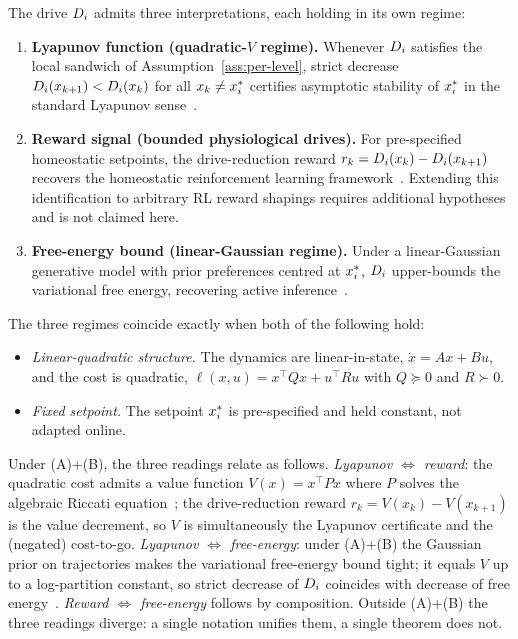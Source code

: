 \documentclass[11pt,a4paper]{article}
\begin{document}
\begin{proposition}
\label{prop:triple}
The drive $D_{i}$ admits three interpretations, each holding in its
own regime:
\begin{enumerate}
  \item \textbf{Lyapunov function (quadratic-$V$ regime).}  Whenever
        $D_{i}$ satisfies the local sandwich of
        Assumption~\ref{ass:per-level}, strict decrease
        $D_{i}(x_{k+1}) < D_{i}(x_k)$ for all $x_k \neq
        x^*_{i}$ certifies asymptotic stability of $x^*_{i}$
        in the standard Lyapunov
        sense~\cite{khalil2002nonlinear}.
  \item \textbf{Reward signal (bounded physiological drives).}  For
        pre-specified homeostatic setpoints, the drive-reduction reward
        $r_k = D_{i}(x_k) - D_{i}(x_{k+1})$ recovers the
        homeostatic reinforcement learning
        framework~\cite{keramati2014homeostatic}.  Extending this
        identification to arbitrary RL reward shapings requires
        additional hypotheses and is not claimed here.
  \item \textbf{Free-energy bound (linear-Gaussian regime).}  Under a
        linear-Gaussian generative model with prior preferences centred
        at $x^*_{i}$, $D_{i}$ upper-bounds the variational
        free energy, recovering active
        inference~\cite{friston2009reinforcement,baltieri2019pid}.
\end{enumerate}
The three regimes coincide exactly when both of the following hold:
\begin{itemize}
  \item[\textbf{(A)}] \emph{Linear-quadratic structure.}  The dynamics
        are linear-in-state, $\dot{x} = Ax + Bu$, and the cost is
        quadratic, $\ell(x,u) = x^\top Q x + u^\top R u$ with
        $Q \succeq 0$ and $R \succ 0$.
  \item[\textbf{(B)}] \emph{Fixed setpoint.}  The setpoint
        $x^*_{i}$ is pre-specified and held constant, not adapted
        online.
\end{itemize}
Under (A)+(B), the three readings relate as follows.
\emph{Lyapunov $\Leftrightarrow$ reward}: the quadratic cost admits
a value function $V(x) = x^\top P x$ where $P$ solves the algebraic
Riccati equation~\cite{khalil2002nonlinear}; the drive-reduction
reward $r_k = V(x_k) - V(x_{k+1})$ is the value decrement, so $V$ is
simultaneously the Lyapunov certificate and the (negated) cost-to-go.
\emph{Lyapunov $\Leftrightarrow$ free-energy}: under (A)+(B) the
Gaussian prior on trajectories makes the variational free-energy
bound tight; it equals $V$ up to a log-partition constant, so strict
decrease of $D_{i}$ coincides with decrease of free
energy~\cite{baltieri2019pid}.  \emph{Reward $\Leftrightarrow$
free-energy} follows by composition.  Outside (A)+(B) the three
readings diverge: a single notation unifies them, a single theorem
does not.
\end{proposition}
\end{document}
